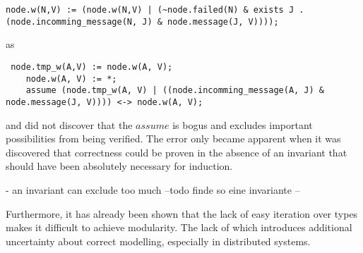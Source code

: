 \documentclass[fleqn]{article}
\begin{document}
\begin{mdframed}[backgroundcolor=light-gray, roundcorner=10pt,leftmargin=1, rightmargin=1, innerleftmargin=5, innertopmargin=15,innerbottommargin=15, outerlinewidth=1, linecolor=light-gray]
\begin{lstlisting}
node.w(N,V) := (node.w(N,V) | (~node.failed(N) & exists J . (node.incomming_message(N, J) & node.message(J, V))));
\end{lstlisting}
\end{mdframed}

as

\begin{mdframed}[backgroundcolor=light-gray, roundcorner=10pt,leftmargin=1, rightmargin=1, innerleftmargin=5, innertopmargin=15,innerbottommargin=15, outerlinewidth=1, linecolor=light-gray]
\begin{lstlisting}
 node.tmp_w(A,V) := node.w(A, V);
    node.w(A, V) := *;
    assume (node.tmp_w(A, V) | ((node.incomming_message(A, J) & node.message(J, V)))) <-> node.w(A, V);
\end{lstlisting}
\end{mdframed}
 and did not discover that the $assume$ is bogus and excludes important possibilities from being verified. The error only became apparent when it was discovered that correctness could be proven in the absence of an invariant that should have been absolutely necessary for induction.

- an invariant can exclude too much
--todo finde so eine invariante --

Furthermore, it has already been shown that the lack of easy iteration over types makes it difficult to achieve modularity. The lack of which introduces additional uncertainty about correct modelling, especially in distributed systems.
\end{document}
